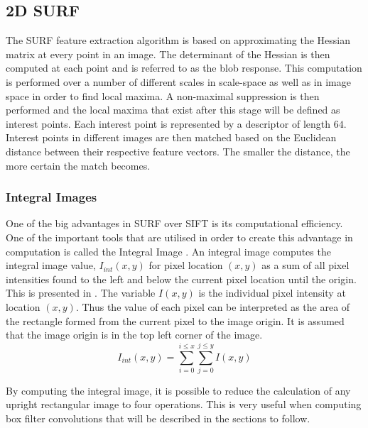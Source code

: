 \documentclass[11pt]{report}
\begin{document}
\subsection{2D SURF}
\label{sec:2dsurf}
The SURF feature extraction algorithm is based on approximating the Hessian matrix at every point in an image. The determinant of the Hessian is then computed at each point and is referred to as the blob response. This computation is performed over a number of different scales in scale-space as well as in image space in order to find local maxima. A non-maximal suppression is then performed and the local maxima that exist after this stage will be defined as interest points. Each interest point is represented by a descriptor of length $64$. Interest points in different images are then matched based on the Euclidean distance between their respective feature vectors. The smaller the distance, the more certain the match becomes. 

\subsubsection{Integral Images}
\label{sec:integralImages}
One of the big advantages in SURF over SIFT \cite{Lowe2004} is its computational efficiency. One of the important tools that are utilised in order to create this advantage in computation is called the Integral Image \cite{Bay2008}. An integral image computes the integral image value, $I_{int}(x,y)$ for pixel location $(x,y)$  as a sum of all pixel intensities found to the left and below the current pixel location until the origin. This is presented in . The variable $I(x,y)$ is the individual pixel intensity at location $(x,y)$. Thus the value of each pixel can be interpreted as the area of the rectangle formed from the current pixel to the image origin. It is assumed that the image origin is in the top left corner of the image. \\

\begin{equation}
I_{int}(x,y) = \sum_{i=0}^{i \leq x}\sum_{j=0}^{j \leq y}I(x,y)
\label{eqn:integralImage}
\end{equation}

By computing the integral image, it is possible to reduce the calculation of any upright rectangular image to four operations. This is very useful when computing box filter convolutions that will be described in the sections to follow.\\
\end{document}
